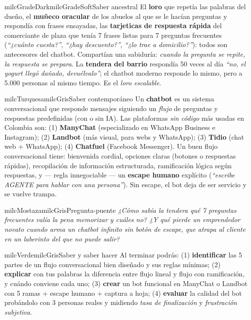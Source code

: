 \documentclass[11pt,letterpaper]{article}
\begin{document}
\begin{softbox}{milcGradeDark}{milcGradeSoft}{Saber ancestral}
El \textbf{loro} que repetía las palabras del dueño, el \textbf{muñeco oracular} de los abuelos al que se le hacían preguntas y respondía con frases ensayadas, las \textbf{tarjeticas de respuesta rápida} del comerciante de plaza que tenía 7 frases listas para 7 preguntas frecuentes (\emph{``¿cuánto cuesta?''}, \emph{``¿hay descuento?''}, \emph{``¿lo trae a domicilio?''}): todos son antecesores del chatbot. Compartían una sabiduría: \emph{cuando la pregunta se repite, la respuesta se prepara}. La \textbf{tendera del barrio} respondía 50 veces al día \emph{``no, el yogurt llegó dañado, devuélvalo''}; el chatbot moderno responde lo mismo, pero a 5.000 personas al mismo tiempo. Es el \emph{loro escalable}.
\end{softbox}

\begin{softbox}{milcTurquesa}{milcGris}{Saber contemporáneo}
Un \textbf{chatbot} es un sistema conversacional que responde mensajes siguiendo un \emph{flujo} de preguntas y respuestas predefinidas (con o sin IA). Las plataformas \emph{sin código} más usadas en Colombia son: (1) \textbf{ManyChat} (especializado en WhatsApp Business e Instagram); (2) \textbf{Landbot} (más visual, para webs y WhatsApp); (3) \textbf{Tidio} (chat web + WhatsApp); (4) \textbf{Chatfuel} (Facebook Messenger). Un buen flujo conversacional tiene: bienvenida cordial, opciones claras (botones o respuestas rápidas), recopilación de información estructurada, ramificación lógica según respuestas, y --- regla innegociable --- un \textbf{escape humano} explícito (\emph{``escribe AGENTE para hablar con una persona''}). Sin escape, el bot deja de ser servicio y se vuelve trampa.
\end{softbox}

\begin{softbox}{milcMostaza}{milcGris}{Pregunta-puente}
\textit{¿Cómo sabía la tendera qué 7 preguntas frecuentes valía la pena memorizar y cuáles no? ¿Y qué pierde un emprendedor novato cuando arma un chatbot infinito sin botón de escape, que atrapa al cliente en un laberinto del que no puede salir?}
\end{softbox}

\begin{softbox}{milcVerde}{milcGris}{Saber y saber hacer}
Al terminar podrás: (1) \textbf{identificar} las 5 partes de un flujo conversacional bien diseñado y sus reglas mínimas; (2) \textbf{explicar} con tus palabras la diferencia entre flujo lineal y flujo con ramificación, y cuándo conviene cada uno; (3) \textbf{crear} un bot funcional en ManyChat o Landbot con 5 ramas + escape humano + captura a hoja; (4) \textbf{evaluar} la calidad del bot probándolo con 3 personas reales y midiendo \emph{tasa de finalización} y \emph{frustración subjetiva}.
\end{softbox}
\end{document}
